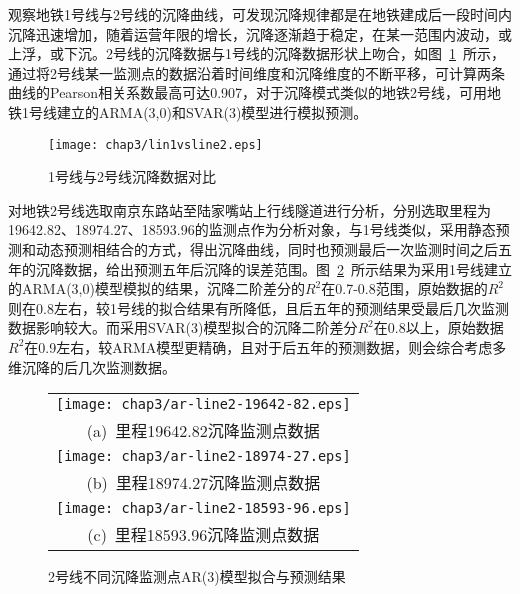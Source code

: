 观察地铁1号线与2号线的沉降曲线，可发现沉降规律都是在地铁建成后一段时间内沉降迅速增加，随着运营年限的增长，沉降逐渐趋于稳定，在某一范围内波动，或上浮，或下沉。2号线的沉降数据与1号线的沉降数据形状上吻合，如图~\ref{fig:1号线与2号线沉降数据对比}~所示，通过将2号线某一监测点的数据沿着时间维度和沉降维度的不断平移，可计算两条曲线的Pearson相关系数最高可达0.907，对于沉降模式类似的地铁2号线，可用地铁1号线建立的ARMA(3,0)和SVAR(3)模型进行模拟预测。

\begin{figure}[htb!]
    \centering
    \texttt{[image: chap3/lin1vsline2.eps]}
    \caption{1号线与2号线沉降数据对比}
    \label{fig:1号线与2号线沉降数据对比}
\end{figure}

对地铁2号线选取南京东路站至陆家嘴站上行线隧道进行分析，分别选取里程为19642.82、18974.27、18593.96的监测点作为分析对象，与1号线类似，采用静态预测和动态预测相结合的方式，得出沉降曲线，同时也预测最后一次监测时间之后五年的沉降数据，给出预测五年后沉降的误差范围。图~\ref{fig:2号线不同沉降监测点AR3模型拟合与预测结果}~所示结果为采用1号线建立的ARMA(3,0)模型模拟的结果，沉降二阶差分的$R^2$在0.7-0.8范围，原始数据的$R^2$则在0.8左右，较1号线的拟合结果有所降低，且后五年的预测结果受最后几次监测数据影响较大。而采用SVAR(3)模型拟合的沉降二阶差分$R^2$在0.8以上，原始数据$R^2$在0.9左右，较ARMA模型更精确，且对于后五年的预测数据，则会综合考虑多维沉降的后几次监测数据。

\begin{figure}[htbp] 
    \centering 
    \begin{tabular}{c} 
        \texttt{[image: chap3/ar-line2-19642-82.eps]} \\ 
        (a)~里程19642.82沉降监测点数据 \\
        \texttt{[image: chap3/ar-line2-18974-27.eps]} \\ 
        (b)~里程18974.27沉降监测点数据 \\
        \texttt{[image: chap3/ar-line2-18593-96.eps]} \\ 
        (c)~里程18593.96沉降监测点数据 \\
    \end{tabular}
    \caption{2号线不同沉降监测点AR(3)模型拟合与预测结果} 
    \label{fig:2号线不同沉降监测点AR3模型拟合与预测结果} 
\end{figure}

